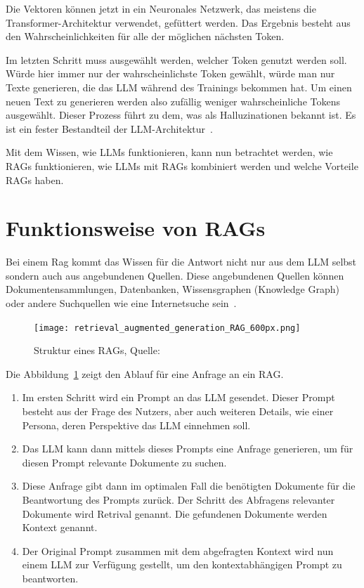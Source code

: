 Die Vektoren können jetzt in ein Neuronales Netzwerk, das meistens die Transformer-Architektur verwendet, gefüttert werden.
Das Ergebnis besteht aus den Wahrscheinlichkeiten für alle der möglichen nächsten Token.

Im letzten Schritt muss ausgewählt werden, welcher Token genutzt werden soll.
Würde hier immer nur der wahrscheinlichste Token gewählt, würde man nur Texte generieren, die das LLM während des Trainings bekommen hat.
Um einen neuen Text zu generieren werden also zufällig weniger wahrscheinliche Tokens ausgewählt.
Dieser Prozess führt zu dem, was als Halluzinationen bekannt ist.
Es ist ein fester Bestandteil der LLM-Architektur~\cite{fraunhofer_iese2025}.

Mit dem Wissen, wie LLMs funktionieren, kann nun betrachtet werden, wie RAGs funktionieren, wie LLMs mit RAGs kombiniert werden und welche Vorteile RAGs haben.

\section{Funktionsweise von RAGs}

Bei einem Rag kommt das Wissen für die Antwort nicht nur aus dem LLM selbst sondern auch aus angebundenen Quellen.
Diese angebundenen Quellen können Dokumentensammlungen, Datenbanken, Wissensgraphen (Knowledge Graph) oder andere Suchquellen wie eine Internetsuche sein~\cite{honroth2024retrieval}.

\begin{figure}[ht!]
    \centering
    \texttt{[image: retrieval\_augmented\_generation\_RAG\_600px.png]}
    \caption[Struktur eines RAGs]{Struktur eines RAGs, Quelle: \cite{honroth2024retrieval}}
    \label{fig:Rag_Structure}
\end{figure}

Die Abbildung~\ref{fig:Rag_Structure} zeigt den Ablauf für eine Anfrage an ein RAG.
\begin{enumerate}
    \item Im ersten Schritt wird ein Prompt an das LLM gesendet.
    Dieser Prompt besteht aus der Frage des Nutzers, aber auch weiteren Details, wie einer Persona, deren Perspektive das LLM einnehmen soll.
    \item Das LLM kann dann mittels dieses Prompts eine Anfrage generieren, um für diesen Prompt relevante Dokumente zu suchen.
    \item Diese Anfrage gibt dann im optimalen Fall die benötigten Dokumente für die Beantwortung des Prompts zurück.
    Der Schritt des Abfragens relevanter Dokumente wird Retrival genannt.
    Die gefundenen Dokumente werden Kontext genannt.
    \item Der Original Prompt zusammen mit dem abgefragten Kontext wird nun einem LLM zur Verfügung gestellt, um den kontextabhängigen Prompt zu beantworten.
\end{enumerate}
